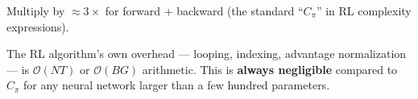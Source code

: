 \documentclass[11pt]{article}
\newcommand{\bigO}{\mathcal{O}}
\begin{document}
Multiply by $\approx 3\times$ for forward + backward (the standard ``$C_\pi$'' in RL complexity expressions).

The RL algorithm's own overhead --- looping, indexing, advantage normalization --- is $\bigO(NT)$ or $\bigO(BG)$ arithmetic.
This is \textbf{always negligible} compared to $C_\pi$ for any neural network larger than a few hundred parameters.
\end{document}
